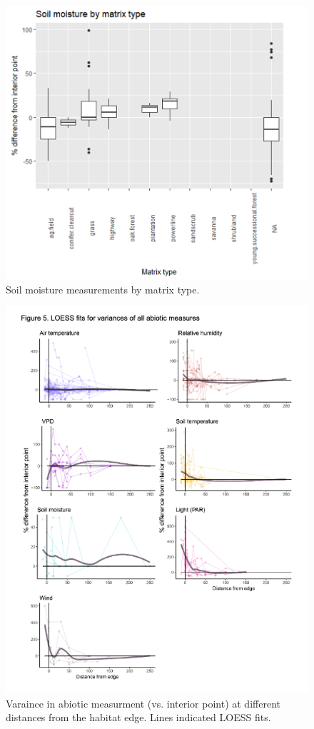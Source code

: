 \documentclass[
  man]{apa6}
\begin{document}
\begin{figure}[H]

{\centering \includegraphics[width=0.8\linewidth,]{images/temp_00011} 

}

\caption{Soil moisture measurements by matrix type.}\label{fig:soil-moisture}
\end{figure}

\begin{figure}[H]

{\centering \includegraphics[width=0.8\linewidth,]{images/temp_00009} 

}

\caption{Varaince in abiotic measurment (vs. interior point) at different distances from the habitat edge. Lines indicated LOESS fits.}\label{fig:var-dist-all}
\end{figure}
\end{document}
